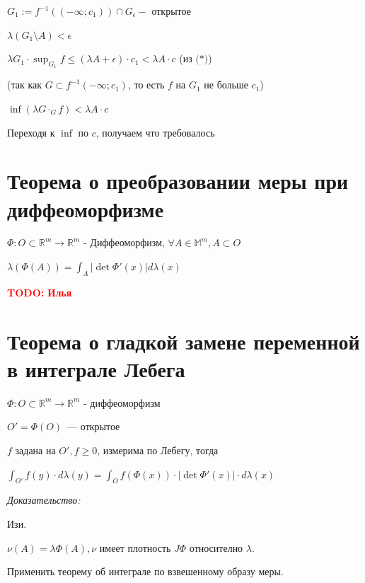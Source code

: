 \documentclass[paper=a4, fontsize=17pt]{article}
\begin{document}
\begin{enumerate}
	$G_1 := f^{-1}((- \infty; c_1)) \cap G_{\epsilon} - $ открытое

	$\lambda(G_1 \setminus A) < \epsilon$

	$\lambda G_1 \cdot \sup_{G_1} f \leqslant (\lambda A + \epsilon) \cdot c_1 < \lambda A \cdot c$ (из $\textbf{(*)}$)

	(так как $G \subset f^{-1}(- \infty; c_1)$, то есть $f$ на $G_1$ не больше $c_1$)

	$\inf(\lambda G \cdot_G f) < \lambda A \cdot c$

	Переходя к $\inf$ по $c$, получаем что требовалось
\end{enumerate}

\section{Теорема о преобразовании меры при диффеоморфизме}
$\Phi: O \subset \mathds{R}^m \rightarrow \mathds{R}^m$ - Диффеоморфизм, $\forall A \in \mathds{M}^m, A \subset O$

$\lambda(\Phi(A)) = \int_A |\det \Phi' (x)| d \lambda(x)$

\textcolor{red}{\textbf{TODO: Илья}}

\section{Теорема о гладкой замене переменной в интеграле Лебега}
$\Phi: O \subset \mathds{R}^m \rightarrow \mathds{R}^m$ - диффеоморфизм

$O' = \Phi(O)$~--- открытое

$f$ задана на $O', f \geqslant 0$, измерима по Лебегу, тогда

$\int_{O'}f(y) \cdot d \lambda(y) = \int_O f(\Phi(x)) \cdot |\det \Phi'(x)| \cdot d \lambda(x)$

\emph{Доказательство:}

Изи.

$\nu(A) = \lambda \Phi (A), \nu$ имеет плотность $J \Phi$ относително $\lambda$.

Применить теорему об интеграле по взвешенному образу меры.


\end{document}
